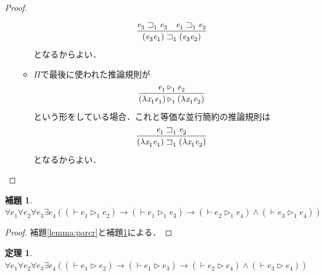 \documentclass{ltjsbook}%
\newtheorem{theorem}{定理}[section]%
\newtheorem{lemma}{補題}[section]%
\newcommand\lemmaname{補題}%
\begin{document}
\begin{proof}
\begin{itemize}
\begin{itemize}
\begin{equation}
      \infer{%
        (\mathit{e}_3^{}\mathit{e}_1^{})\sqsupset_1^{}(\mathit{e}_3^{}\mathit{e}_2^{})%
      }{%
        \mathit{e}_3^{}\sqsupset_1^{}\mathit{e}_3^{}%
      &%
        \mathit{e}_1^{}\sqsupset_1^{}\mathit{e}_2^{}%
      }%
    \end{equation}%
    となるからよい．%
    \item$\Pi$で最後に使われた推論規則が%
    \begin{equation}%
      \infer{%
        (\lambda\mathit{x}_1^{}\mathit{e}_1^{})\triangleright_1^{}%
        (\lambda\mathit{x}_1^{}\mathit{e}_2^{})%
      }{%
        \mathit{e}_1^{}\triangleright_1^{}\mathit{e}_2^{}%
      }%
    \end{equation}%
    という形をしている場合．これと等価な並行簡約の推論規則は%
    \begin{equation}%
      \infer{%
        (\lambda\mathit{x}_1^{}\mathit{e}_1^{})\sqsupset_1^{}%
        (\lambda\mathit{x}_1^{}\mathit{e}_2^{})%
      }{%
        \mathit{e}_1^{}\sqsupset_1^{}\mathit{e}_2^{}%
      }%
    \end{equation}%
    となるからよい．%
    \end{itemize}%
  \end{itemize}%
\end{proof}%
\begin{lemma}%
  \label{lemma:beta1cr}%
  $\forall\mathit{e}_1^{}\forall\mathit{e}_2^{}\forall\mathit{e}_3^{}\exists\mathit{e}_4^{}%
  ((\vdash\mathit{e}_1^{}\triangleright_1^{}\mathit{e}_2^{})\rightarrow%
  (\vdash\mathit{e}_1^{}\triangleright_1^{}\mathit{e}_3^{})\rightarrow%
  (\vdash\mathit{e}_2^{}\triangleright_1^{}\mathit{e}_4^{})\land%
  (\vdash\mathit{e}_3^{}\triangleright_1^{}\mathit{e}_4^{}))$%
\end{lemma}%
\begin{proof}%
  \lemmaname\ref{lemma:parcr}と\lemmaname\ref{lemma:beta1cr}による．%
\end{proof}%
\begin{theorem}%
  $\forall\mathit{e}_1^{}\forall\mathit{e}_2^{}\forall\mathit{e}_3^{}\exists\mathit{e}_4^{}%
  ((\vdash\mathit{e}_1^{}\triangleright\mathit{e}_2^{})\rightarrow%
  (\vdash\mathit{e}_1^{}\triangleright\mathit{e}_3^{})\rightarrow%
  (\vdash\mathit{e}_2^{}\triangleright\mathit{e}_4^{})\land%
  (\vdash\mathit{e}_3^{}\triangleright\mathit{e}_4^{}))$%
\end{theorem}%
\end{document}
